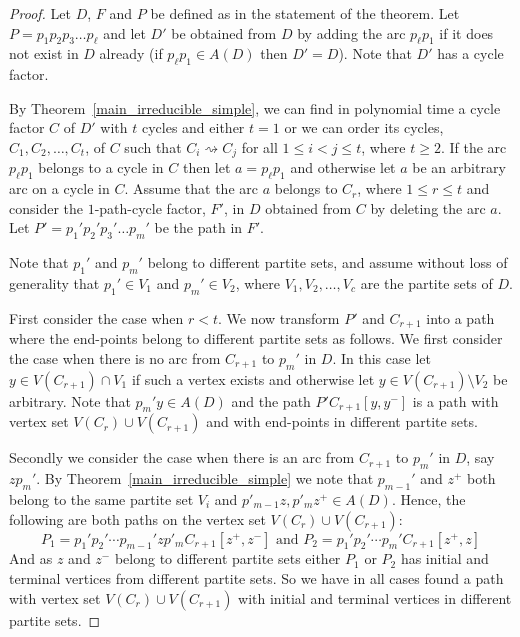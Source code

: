 \documentclass[10pt,a4paper]{amsart}
\newcommand{\GGnn}[1]{{#1}}
\newcommand{\wdom}[1]{\rightsquigarrow}
\begin{document}
\begin{proof}

Let $D$, ${F}$ and $P$ be defined as in the statement of the theorem. Let $P=p_1 p_2 p_3 \ldots p_{\ell}$ and
let $D'$ be obtained from $D$ by adding the arc $p_{\ell} p_1$ if it does not exist in $D$ already (if $p_{\ell} p_1 \in A(D)$ then $D'=D$).
Note that $D'$ has a cycle factor. 

By Theorem~\ref{main_irreducible_simple}, we can find in polynomial time a cycle factor $C$  of $D'$ with $t$ cycles and either $t=1$ or we can order its cycles, $C_1,C_2,\ldots,C_t$, of ${C}$ such that
$C_i \wdom{} C_j$ for all $1 \leq i < j \leq t$, where $t \geq 2$. If the arc $p_{\ell} p_1$ belongs to a cycle in ${C}$ then let $a=p_{\ell} p_1$ and otherwise let $a$ be an arbitrary arc on a cycle in ${C}$.
Assume that the arc $a$ belongs to $C_r$, where $1 \leq r \leq t$ and consider the $1$-path-cycle factor, ${F}'$, in $D$ obtained from
${C}$ by deleting the arc $a$. Let $P'=p_1' p_2' p_3' \ldots p_m'$ be the path in ${F}'$.

Note that $p_1'$ and $p_m'$ belong to different partite sets, and assume without loss of generality that $p_1' \in V_1$ and $p_m' \in V_2$, where
$V_1,V_2,\ldots,V_c$ are the partite sets of $D$.

First consider the case when $r<t$. We now transform $P'$ and $C_{r+1}$ into a path where the end-points belong to different partite sets as follows.
We first consider the case when there is no arc from $C_{r+1}$ to $p_m'$ in $D$. In this case let $y \in V(C_{r+1}) \cap V_1$ if such a vertex exists and otherwise let $y \in V(C_{r+1}) \setminus V_2$ be arbitrary. Note that $p_m' y \in A(D)$ and the path $P' C_{r+1}[y,y^-]$ is a path with vertex set $V(C_r) \cup V(C_{r+1})$ and with end-points in different partite sets.

Secondly we consider the case when there is an arc from $C_{r+1}$ to $p_m'$ in $D$, say $z p_m'$.
By Theorem~\ref{main_irreducible_simple} we note that $p_{m-1}'$ and $z^+$ both belong to the same partite set $V_i$ \GGnn{and $p'_{m-1}z,p'_mz^+\in A(D).$} 
Hence, the following are both paths on the vertex set $V(C_r) \cup V(C_{r+1})$:
\[
P_1 = p_1' p_2' \cdots p_{m-1}' z p'_m C_{r+1}[z^+,z^-] \mbox{ and }
P_2 = p_1' p_2' \cdots p_{m}' C_{r+1}[z^+,z]
\]
And as $z$ and $z^-$ belong to different partite sets either $P_1$ or $P_2$ has initial and terminal vertices from different partite sets. So we have in all cases
found a path with vertex set $V(C_r) \cup V(C_{r+1})$ with  initial and terminal vertices in different partite sets.


\end{proof}
\end{document}
